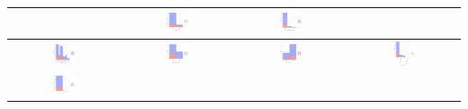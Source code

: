 \begin{table}
\begin{center}
\begin{tabular}{ |c|c|c|c| }
			& \includegraphics[width=0.22\textwidth]{NOTEBOOK/IMAGENES_BIRCH_DESCRIPTIVAS/31} 
			& \includegraphics[width=0.22\textwidth]{NOTEBOOK/IMAGENES_BIRCH_DESCRIPTIVAS/32}
			\\  \hline 
			\includegraphics[width=0.22\textwidth]{NOTEBOOK/IMAGENES_BIRCH_DESCRIPTIVAS/33} 
			& \includegraphics[width=0.22\textwidth]{NOTEBOOK/IMAGENES_BIRCH_DESCRIPTIVAS/34} 
			& \includegraphics[width=0.22\textwidth]{NOTEBOOK/IMAGENES_BIRCH_DESCRIPTIVAS/35} 
			& \includegraphics[width=0.22\textwidth]{NOTEBOOK/IMAGENES_BIRCH_DESCRIPTIVAS/36}         
			\\  \hline
			\includegraphics[width=0.22\textwidth]{NOTEBOOK/IMAGENES_BIRCH_DESCRIPTIVAS/37} 

\end{tabular}
\end{center}
\end{table}

